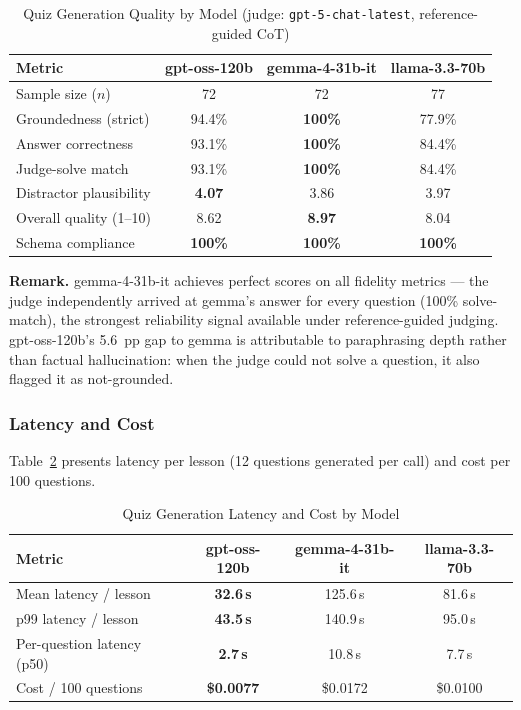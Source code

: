 \renewcommand{\arraystretch}{1.3}
\begin{table}[htbp]
\centering
\caption{Quiz Generation Quality by Model (judge: \texttt{gpt-5-chat-latest}, reference-guided CoT)}
\label{tab:model_quality}
\begin{tabular}{|l|c|c|c|}
\hline
\textbf{Metric} & \textbf{gpt-oss-120b} & \textbf{gemma-4-31b-it} & \textbf{llama-3.3-70b} \\
\hline
Sample size ($n$)           & 72  & 72  & 77  \\
Groundedness (strict)       & 94.4\% & \textbf{100\%} & 77.9\% \\
Answer correctness          & 93.1\% & \textbf{100\%} & 84.4\% \\
Judge-solve match           & 93.1\% & \textbf{100\%} & 84.4\% \\
Distractor plausibility     & \textbf{4.07} & 3.86 & 3.97 \\
Overall quality (1--10)     & 8.62 & \textbf{8.97} & 8.04 \\
Schema compliance           & \textbf{100\%} & \textbf{100\%} & \textbf{100\%} \\
\hline
\end{tabular}
\end{table}

\textbf{Remark.} gemma-4-31b-it achieves perfect scores on all fidelity metrics --- the judge independently arrived at gemma's answer for every question (100\% solve-match), the strongest reliability signal available under reference-guided judging. gpt-oss-120b's 5.6~pp gap to gemma is attributable to paraphrasing depth rather than factual hallucination: when the judge could not solve a question, it also flagged it as not-grounded.

\subsubsection{Latency and Cost}

Table~\ref{tab:model_latency} presents latency per lesson (12 questions generated per call) and cost per 100 questions.

\begin{table}[htbp]
\centering
\caption{Quiz Generation Latency and Cost by Model}
\label{tab:model_latency}
\renewcommand{\arraystretch}{1.3}
\begin{tabular}{|l|c|c|c|}
\hline
\textbf{Metric} & \textbf{gpt-oss-120b} & \textbf{gemma-4-31b-it} & \textbf{llama-3.3-70b} \\
\hline
Mean latency / lesson       & \textbf{32.6\,s} & 125.6\,s & 81.6\,s \\
p99 latency / lesson        & \textbf{43.5\,s} & 140.9\,s & 95.0\,s \\
Per-question latency (p50)  & \textbf{2.7\,s} & 10.8\,s & 7.7\,s \\
Cost / 100 questions        & \textbf{\$0.0077} & \$0.0172 & \$0.0100 \\
\hline
\end{tabular}
\end{table}

